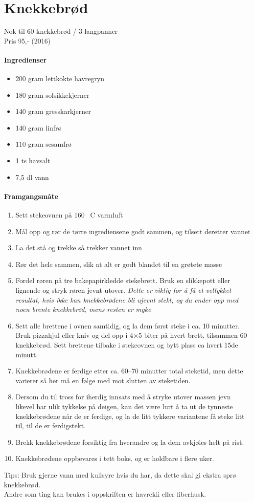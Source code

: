 \section{﻿Knekkebrød}
Nok til 60 knekkebrød / 3 langpanner\\
Pris 95,- (2016)

\paragraph{Ingredienser}
\begin{itemize}[noitemsep]
  \item 200 gram lettkokte havregryn
  \item 180 gram solsikkekjerner
  \item 140 gram gresskarkjerner
  \item 140 gram linfrø
  \item 110 gram sesamfrø
  \item 1 ts havsalt
  \item 7,5 dl vann
\end{itemize}

\paragraph{Framgangsmåte}
\begin{enumerate}[noitemsep]
  \item Sett stekeovnen på 160 \degree~C varmluft
  \item Mål opp og rør de tørre ingrediensene godt sammen, og tilsett deretter vannet
  \item La det stå og trekke så trekker vannet inn
  \item Rør det hele sammen, slik at alt er godt blandet til en grøtete masse
  \item Fordel røren på tre bakepapirkledde stekebrett. Bruk en slikkepott eller lignende og stryk røren jevnt utover. \emph{Dette er viktig for å få et vellykket resultat, hvis ikke kan knekkebrødene bli ujevnt stekt, og du ender opp med noen brente knekkebrød, mens resten er myke}
  \item Sett alle brettene i ovnen samtidig, og la dem først steke i ca. 10 minutter. Bruk pizzahjul eller kniv og del opp i 4×5 biter på hvert brett, tilsammen 60 knekkebrød. Sett brettene tilbake i stekeovnen og bytt plass ca hvert 15de minutt.
  \item Knekkebrødene er ferdige etter ca. 60--70 minutter total steketid, men dette varierer så her må en følge med mot slutten av steketiden.
  \item Dersom du til tross for iherdig innsats med å stryke utover massen jevn likevel har ulik tykkelse på deigen, kan det være lurt å ta ut de tynneste knekkebrødene når de er ferdige, og la de litt tykkere variantene få steke litt til, til de er ferdigstekt.
  \item Brekk knekkebrødene forsiktig fra hverandre og la dem avkjøles helt på rist.
  \item Knekkebrødene oppbevares i tett boks, og er holdbare i flere uker.
\end{enumerate}



Tips: Bruk gjerne vann med kullsyre hvis du har, da dette skal gi ekstra sprø knekkebrød. \\ Andre som ting kan brukes i oppskriften er havrekli eller fiberhusk.
